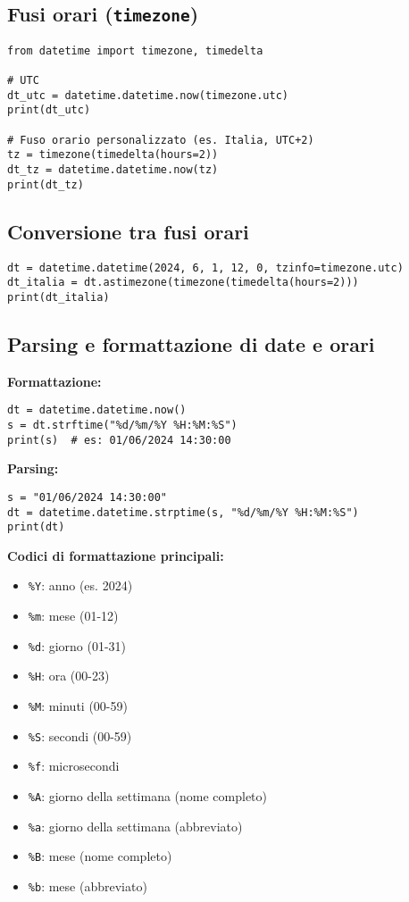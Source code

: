 \documentclass[a4paper,12pt]{article}
\begin{document}
\subsection*{Fusi orari (\texttt{timezone})}
\begin{lstlisting}
from datetime import timezone, timedelta

# UTC
dt_utc = datetime.datetime.now(timezone.utc)
print(dt_utc)

# Fuso orario personalizzato (es. Italia, UTC+2)
tz = timezone(timedelta(hours=2))
dt_tz = datetime.datetime.now(tz)
print(dt_tz)
\end{lstlisting}

\subsection*{Conversione tra fusi orari}
\begin{lstlisting}
dt = datetime.datetime(2024, 6, 1, 12, 0, tzinfo=timezone.utc)
dt_italia = dt.astimezone(timezone(timedelta(hours=2)))
print(dt_italia)
\end{lstlisting}

\subsection*{Parsing e formattazione di date e orari}
\textbf{Formattazione:}
\begin{lstlisting}
dt = datetime.datetime.now()
s = dt.strftime("%d/%m/%Y %H:%M:%S")
print(s)  # es: 01/06/2024 14:30:00
\end{lstlisting}

\textbf{Parsing:}
\begin{lstlisting}
s = "01/06/2024 14:30:00"
dt = datetime.datetime.strptime(s, "%d/%m/%Y %H:%M:%S")
print(dt)
\end{lstlisting}

\textbf{Codici di formattazione principali:}
\begin{itemize}
    \item \texttt{\%Y}: anno (es. 2024)
    \item \texttt{\%m}: mese (01-12)
    \item \texttt{\%d}: giorno (01-31)
    \item \texttt{\%H}: ora (00-23)
    \item \texttt{\%M}: minuti (00-59)
    \item \texttt{\%S}: secondi (00-59)
    \item \texttt{\%f}: microsecondi
    \item \texttt{\%A}: giorno della settimana (nome completo)
    \item \texttt{\%a}: giorno della settimana (abbreviato)
    \item \texttt{\%B}: mese (nome completo)
    \item \texttt{\%b}: mese (abbreviato)
\end{itemize}
\end{document}
